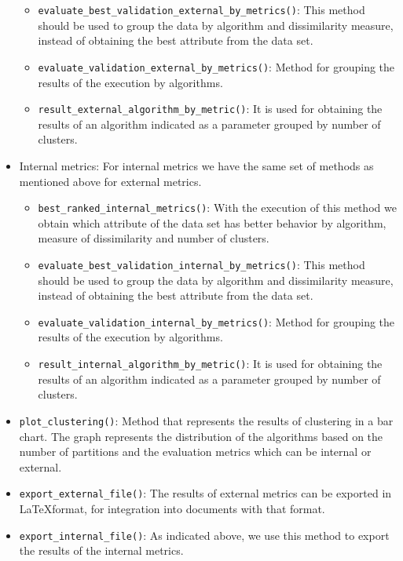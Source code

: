 \begin{itemize}
\begin{itemize}
      \item \texttt{evaluate\_best\_validation\_external\_by\_metrics()}: This method should be used to group the data by algorithm and dissimilarity measure, instead of obtaining the best attribute from the data set.
      \item \texttt{evaluate\_validation\_external\_by\_metrics()}: Method for grouping the results of the execution by algorithms.
      \item \texttt{result\_external\_algorithm\_by\_metric()}: It is used for obtaining the results of an algorithm indicated as a parameter grouped by number of clusters.
\end{itemize}
  \item Internal metrics: For internal metrics we have the same set of methods as mentioned above for external metrics.
  \begin{itemize}
    \item \texttt{best\_ranked\_internal\_metrics()}: With the execution of this method we obtain which attribute of the data set has better behavior by algorithm, measure of dissimilarity and number of clusters.
    \item \texttt{evaluate\_best\_validation\_internal\_by\_metrics()}: This method should be used to group the data by algorithm and dissimilarity measure, instead of obtaining the best attribute from the data set.
    \item \texttt{evaluate\_validation\_internal\_by\_metrics()}: Method for grouping the results of the execution by algorithms.
    \item \texttt{result\_internal\_algorithm\_by\_metric()}: It is used for obtaining the results of an algorithm indicated as a parameter grouped by number of clusters.
  \end{itemize}
    \item \texttt{plot\_clustering()}: Method that represents the results of clustering in a bar chart. The graph represents the distribution of the algorithms based on the number of partitions and the evaluation metrics which can be internal or external.
    \item \texttt{export\_external\_file()}: The results of external metrics can be exported in \LaTeX format, for integration into documents with that format.
    \item \texttt{export\_internal\_file()}: As indicated above, we use this method to export the results of the internal metrics.
\end{itemize}

